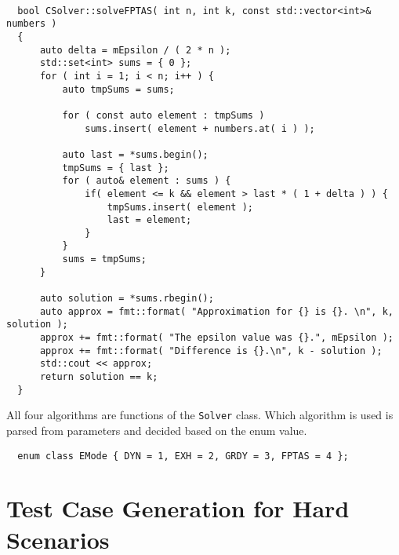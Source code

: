 \documentclass[11pt]{article}
\begin{document}
\begin{verbatim}

  bool CSolver::solveFPTAS( int n, int k, const std::vector<int>& numbers )
  {
      auto delta = mEpsilon / ( 2 * n );
      std::set<int> sums = { 0 };
      for ( int i = 1; i < n; i++ ) {
          auto tmpSums = sums;
  
          for ( const auto element : tmpSums ) 
              sums.insert( element + numbers.at( i ) );
  
          auto last = *sums.begin();
          tmpSums = { last };
          for ( auto& element : sums ) {
              if( element <= k && element > last * ( 1 + delta ) ) {
                  tmpSums.insert( element );
                  last = element;
              }
          }
          sums = tmpSums;
      }
  
      auto solution = *sums.rbegin();
      auto approx = fmt::format( "Approximation for {} is {}. \n", k, solution );
      approx += fmt::format( "The epsilon value was {}.", mEpsilon );
      approx += fmt::format( "Difference is {}.\n", k - solution );
      std::cout << approx;
      return solution == k;
  }  
\end{verbatim}

All four algorithms are functions of the \texttt{Solver} class. Which algorithm is used is parsed from parameters and decided based on the enum value.

\begin{verbatim}
  enum class EMode { DYN = 1, EXH = 2, GRDY = 3, FPTAS = 4 };
\end{verbatim}

\section{Test Case Generation for Hard Scenarios}
\end{document}
